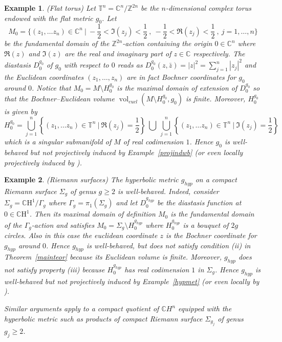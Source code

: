 \documentclass[12pt]{amsart}
\newcommand{\Z}{\mathbb{Z}}
\newcommand{\T}{\mathbb{T}}
\newcommand{\CH}{\mathbb{C}\mathrm{H}}
\newcommand{\C}{\mathbb{C}}
\newcommand{\vol}{{\operatorname{vol}}}
\newtheorem{ex}{Example}
\begin{document}
\begin{ex}\rm\label{exnotwbcomp}(Flat  torus)
	Let $\T^n={\C}^n/{\Z}^{2n}$ be the $n$-dimensional complex torus endowed with the flat metric $g_0$.
	Let
	$$M_0=\{(z_1, \dots z_n)\in\C^n \ | \  -\frac{1}{2}<\Im (z_j)<\frac{1}{2} \ , \ -\frac{1}{2}<\Re (z_j)<\frac{1}{2} \ , \   j=1, \dots ,n\}$$  
	be the fundamental domain of the $\Z^{2n}$-action containing the origin  $0\in\C^n$ where $\Re (z)$ and $\Im (z)$ are the real and imaginary part of $z\in\C$ respectively.
	The diastasis $D_0^{g_0}$ of $g_0$ with respect to $0$ reads as $D^{g_0}_{0}(z, \bar z)=|z|^2=\sum _{j=1}^{n}|z_j|^2$ and the Euclidean coordinates $(z_1,\dots ,z_n)$ are in fact Bochner coordinates for $g_0$ around $0$.
	Notice that $M_0=M\setminus H^{g_0}_0$ is the maximal domain of extension of $D^{g_0}_0$ so that the Bochner--Euclidean volume $\vol_{eucl}(M\setminus H^{g_0}_0,g_0)$ is finite.
	Moreover, $H^{g_0}_0$ is given by 
	$$H_0^{g_0}=\bigcup_{j=1}^n\left\{(z_1, \dots z_n)\in \T^n \ |\ \Re (z_j)=\frac{1}{2}\right\}\ \bigcup\ \bigcup_{j=1}^n\left\{(z_1, \dots z_n)\in \T^n \ |\ \Im (z_j)=\frac{1}{2}\right\}$$
	which is a singular submanifold of $M$ of real codimension $1$.
	Hence  $g_0$ is well-behaved but not projectively induced  by Example~\ref{projindwb} (or even locally projectively induced by \cite{Calabi53Isometric}).
\end{ex}

\begin{ex}\rm\label{exnotwbcomp2} (Riemann surfaces)
	The hyperbolic metric $g_{hyp}$ on a compact Riemann surface  $\Sigma_g$ of genus $g\geq 2$ is well-behaved.
	Indeed, consider $\Sigma_g=\CH^1/\Gamma_g$ where $\Gamma_g=\pi_1(\Sigma_g)$ and let $D_0^{g_{hyp}}$ be the diastasis function at $0\in\CH^1$.
	Then its maximal domain of definition $M_0$ is the fundamental domain of the $\Gamma_g$-action and satisfies $M_0=\Sigma_g\setminus H_0^{g_{hyp}}$ where  $H_0^{g_{hyp}}$ is a bouquet of $2g$ circles.
	Also in this case the euclidean coordinate $z$ is the  Bochner coordinate for $g_{hyp}$ around $0$.
	Hence $g_{hyp}$ is well-behaved, but does not satisfy condition (ii) in Theorem~\ref{mainteor} because its Euclidean volume is finite. 
	Moreover, $g_{hyp}$ does not satisfy property (iii) because $H_0^{g_{hyp}}$ has real codimension $1$ in $\Sigma_g$.
	Hence  $g_{hyp}$ is well-behaved but not projectively induced by Example~\ref{hypmet} (or even locally by \cite{Calabi53Isometric}). 

	Similar arguments apply to a compact quotient 
	of $\C H^n$ equipped with the hyperbolic metric such as products of compact Riemann surface  $\Sigma_{g_j}$ of genus $g_j\geq 2$.
\end{ex}
\end{document}
